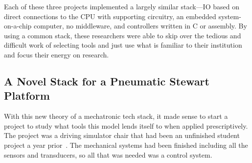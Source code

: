 \documentclass[english,12pt,a4paper,pdftex,eng,utf8]{aaltothesis}
\begin{document}
Each of these three projects implemented a largely similar stack---IO based on direct connections to the CPU with supporting circuitry, an embedded system-on-a-chip computer, no middleware, and controllers written in C or assembly. By using a common stack, these researchers were able to skip over the tedious and difficult work of selecting tools and just use what is familiar to their institution and focus their energy on research.

\subsection{A Novel Stack for a Pneumatic Stewart Platform}\label{sec:stewart_platform}

With this new theory of a mechatronic tech stack, it made sense to start a project to study what tools this model lends itself to when applied prescriptively. The project was a driving simulator chair that had been an unfinished student project a year prior~\cite{Bjoerklund2023}. The mechanical systems had been finished including all the sensors and transducers, so all that was needed was a control system.
\end{document}
